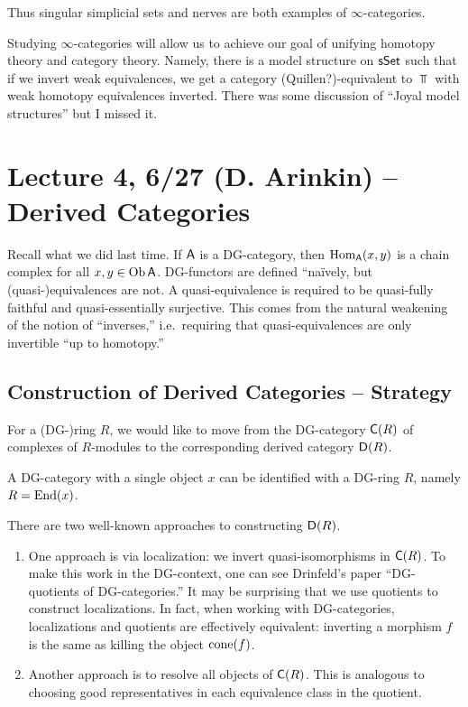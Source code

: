 \documentclass{amsart}
\begin{document}
Thus singular simplicial sets and nerves are both examples of $\infty$-categories.

Studying $\infty$-categories will allow us to achieve our goal of unifying homotopy theory and category theory.
Namely, there is a model structure on $\mathsf{sSet}$ such that if we invert weak equivalences, we get a category (Quillen?)-equivalent to $\Top$ with weak homotopy equivalences inverted.
There was some discussion of ``Joyal model structures'' but I missed it.

\section{Lecture 4, 6/27 (D. Arinkin) -- Derived Categories}

Recall what we did last time.
If $\mathsf{A}$ is a DG-category, then $\operatorname{Hom}_{\mathsf{A}}(x, y)$ is a chain complex for all $x, y \in \operatorname{Ob} \mathsf{A}$.
DG-functors are defined ``na\"ively, but (quasi-)equivalences are not.
A quasi-equivalence is required to be quasi-fully faithful and quasi-essentially surjective.
This comes from the natural weakening of the notion of ``inverses,'' i.e.\ requiring that quasi-equivalences are only invertible ``up to homotopy.''

\subsection{Construction of Derived Categories -- Strategy}

For a (DG-)ring $R$, we would like to move from the DG-category $\mathsf{C}(R)$ of complexes of $R$-modules to the corresponding derived category $\mathsf{D}(R)$.

\begin{ex}
	A DG-category with a single object $x$ can be identified with a DG-ring $R$, namely $R = \operatorname{End}(x)$.
\end{ex}

There are two well-known approaches to constructing $\mathsf{D}(R)$.

\begin{enumerate}
	\item One approach is via localization: we invert quasi-isomorphisms in $\mathsf{C}(R)$.
		To make this work in the DG-context, one can see Drinfeld's paper ``DG-quotients of DG-categories.''
		It may be surprising that we use quotients to construct localizations.
		In fact, when working with DG-categories, localizations and quotients are effectively equivalent: inverting a morphism $f$ is the same as killing the object $\operatorname{cone}(f)$.
	\item Another approach is to resolve all objects of $\mathsf{C}(R)$.
		This is analogous to choosing good representatives in each equivalence class in the quotient.
\end{enumerate}
\end{document}
